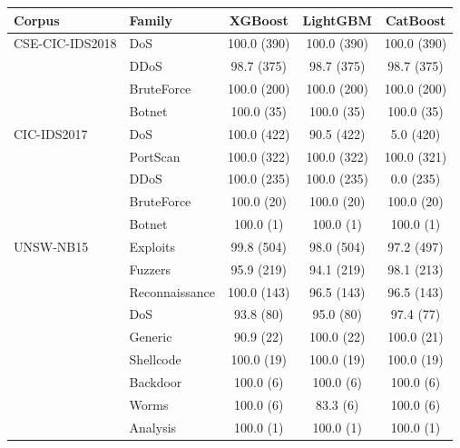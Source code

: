 \begin{tabular}{@{}llccc@{}}
\toprule
\textbf{Corpus} & \textbf{Family} & \textbf{XGBoost} & \textbf{LightGBM} & \textbf{CatBoost} \\
\midrule
CSE-CIC-IDS2018 & DoS & 100.0 (390) & 100.0 (390) & 100.0 (390) \\
 & DDoS & 98.7 (375) & 98.7 (375) & 98.7 (375) \\
 & BruteForce & 100.0 (200) & 100.0 (200) & 100.0 (200) \\
 & Botnet & 100.0 (35) & 100.0 (35) & 100.0 (35) \\
\midrule
CIC-IDS2017 & DoS & 100.0 (422) & 90.5 (422) & 5.0 (420) \\
 & PortScan & 100.0 (322) & 100.0 (322) & 100.0 (321) \\
 & DDoS & 100.0 (235) & 100.0 (235) & 0.0 (235) \\
 & BruteForce & 100.0 (20) & 100.0 (20) & 100.0 (20) \\
 & Botnet & 100.0 (1) & 100.0 (1) & 100.0 (1) \\
\midrule
UNSW-NB15 & Exploits & 99.8 (504) & 98.0 (504) & 97.2 (497) \\
 & Fuzzers & 95.9 (219) & 94.1 (219) & 98.1 (213) \\
 & Reconnaissance & 100.0 (143) & 96.5 (143) & 96.5 (143) \\
 & DoS & 93.8 (80) & 95.0 (80) & 97.4 (77) \\
 & Generic & 90.9 (22) & 100.0 (22) & 100.0 (21) \\
 & Shellcode & 100.0 (19) & 100.0 (19) & 100.0 (19) \\
 & Backdoor & 100.0 (6) & 100.0 (6) & 100.0 (6) \\
 & Worms & 100.0 (6) & 83.3 (6) & 100.0 (6) \\
 & Analysis & 100.0 (1) & 100.0 (1) & 100.0 (1) \\
\bottomrule
\end{tabular}
